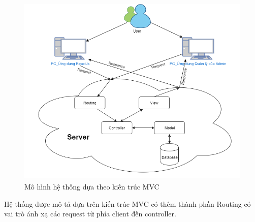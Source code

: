 \documentclass[../DoAn.tex]{subfiles}
\begin{document}
\begin{figure}[H]
    \centering
    \includegraphics[width=11.4cm,height=9.22cm]{Hinhve/server.png}
    \caption{Mô hình hệ thống dựa theo kiến trúc MVC}
    \label{fig:Fig42}
\end{figure}
Hệ thống được mô tả dựa trên kiến trúc MVC có thêm thành phần Routing có vai trò ánh xạ các request từ phía client đến controller.
\end{document}
